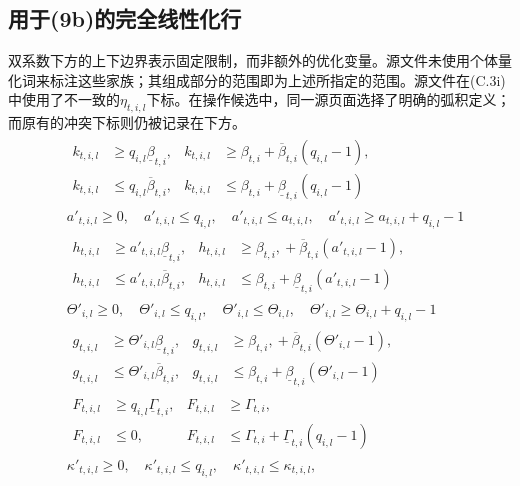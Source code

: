 \documentclass{article}
\begin{document}
\subsection*{用于(9b)的完全线性化行}
双系数下方的上下边界表示固定限制，而非额外的优化变量。源文件未使用个体量化词来标注这些家族；其组成部分的范围即为上述所指定的范围。源文件在(C.3i)中使用了不一致的$\eta_{t,i,l}$下标。在操作候选中，同一源页面选择了明确的弧积定义；而原有的冲突下标则仍被记录在下方。
\begin{align}
&\begin{aligned}
k_{t,i,l}&\geq q_{i,l}\underline\beta_{t,i},&
k_{t,i,l}&\geq\beta_{t,i}+\overline\beta_{t,i}(q_{i,l}-1),\\
k_{t,i,l}&\leq q_{i,l}\overline\beta_{t,i},&
k_{t,i,l}&\leq\beta_{t,i}+\underline\beta_{t,i}(q_{i,l}-1)
\end{aligned}\tag{C.3a}\\
& a'_{t,i,l}\geq0,\quad a'_{t,i,l}\leq q_{i,l},\quad
 a'_{t,i,l}\leq a_{t,i,l},\quad a'_{t,i,l}\geq a_{t,i,l}+q_{i,l}-1
\tag{C.3b}\\
&\begin{aligned}
h_{t,i,l}&\geq a'_{t,i,l}\underline\beta_{t,i},&
h_{t,i,l}&\geq\beta_{t,i},{}+\overline\beta_{t,i}(a'_{t,i,l}-1),\\
h_{t,i,l}&\leq a'_{t,i,l}\overline\beta_{t,i},&
h_{t,i,l}&\leq\beta_{t,i}+\underline\beta_{t,i}(a'_{t,i,l}-1)
\end{aligned}\tag{C.3c}\\
&\Theta'_{i,l}\geq0,\quad\Theta'_{i,l}\leq q_{i,l},\quad
\Theta'_{i,l}\leq\Theta_{i,l},\quad\Theta'_{i,l}\geq\Theta_{i,l}+q_{i,l}-1
\tag{C.3d}\\
&\begin{aligned}
g_{t,i,l}&\geq\Theta'_{i,l}\underline\beta_{t,i},&
g_{t,i,l}&\geq\beta_{t,i},{}+\overline\beta_{t,i}(\Theta'_{i,l}-1),\\
g_{t,i,l}&\leq\Theta'_{i,l}\overline\beta_{t,i},&
g_{t,i,l}&\leq\beta_{t,i}+\underline\beta_{t,i}(\Theta'_{i,l}-1)
\end{aligned}\tag{C.3e}\\
&\begin{aligned}
F_{t,i,l}&\geq q_{i,l}\underline\Gamma_{t,i},&F_{t,i,l}&\geq\Gamma_{t,i},\\
F_{t,i,l}&\leq0,&F_{t,i,l}&\leq\Gamma_{t,i}+\underline\Gamma_{t,i}(q_{i,l}-1)
\end{aligned}\tag{C.3f}\\
&\kappa'_{t,i,l}\geq0,\quad\kappa'_{t,i,l}\leq q_{i,l},\quad
\kappa'_{t,i,l}\leq\kappa_{t,i,l},\quad

\end{align}
\end{document}
